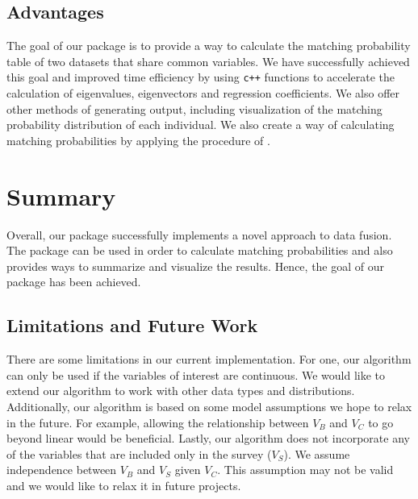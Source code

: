 \subsection{ Advantages}
The goal of our package is to provide a way to calculate the matching probability table of two datasets that share common variables. 
We have successfully achieved this goal and improved time efficiency by using \texttt{c++} functions to accelerate the calculation of eigenvalues, eigenvectors and regression coefficients. We also offer other methods of generating output, including visualization of the matching probability distribution of each individual.  We also create a way of calculating matching probabilities by applying the procedure of \cite{RefWorks:97}.

\section{Summary}

Overall, our package successfully implements a novel approach to data fusion. The package can be used in order to calculate matching probabilities and also provides ways to summarize and visualize the results. Hence, the goal of our package has been achieved.  

\subsection{Limitations and Future Work}

There are some limitations in our current implementation.  For one, our algorithm can only be used if the variables of interest are continuous. We would like to extend our algorithm to work with other data types and distributions. Additionally, our algorithm is based on some model assumptions we hope to relax in the future. For example, allowing the relationship between $V_B$ and $V_C$ to go beyond linear would be beneficial. Lastly, our algorithm does not incorporate any of the variables that are included only in the survey ($V_S$).  We assume independence between $V_B$ and $V_S$ given $V_C$.  This assumption may not be valid and we would like to relax it in future projects.






              
